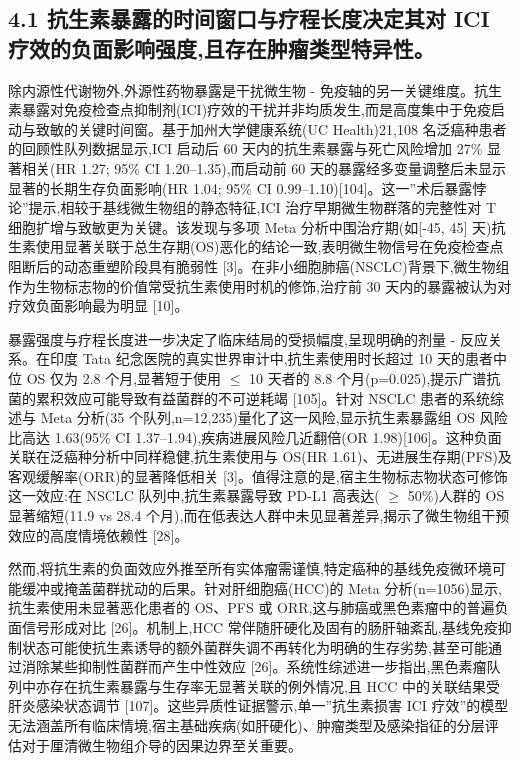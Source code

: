\documentclass[11pt]{article}
\begin{document}
\subsection{4.1 抗生素暴露的时间窗口与疗程长度决定其对 ICI 疗效的负面影响强度,且存在肿瘤类型特异性。}\label{ux6297ux751fux7d20ux66b4ux9732ux7684ux65f6ux95f4ux7a97ux53e3ux4e0eux7597ux7a0bux957fux5ea6ux51b3ux5b9aux5176ux5bf9-ici-ux7597ux6548ux7684ux8d1fux9762ux5f71ux54cdux5f3aux5ea6ux4e14ux5b58ux5728ux80bfux7624ux7c7bux578bux7279ux5f02ux6027}

除内源性代谢物外,外源性药物暴露是干扰微生物 - 免疫轴的另一关键维度。抗生素暴露对免疫检查点抑制剂(ICI)疗效的干扰并非均质发生,而是高度集中于免疫启动与致敏的关键时间窗。基于加州大学健康系统(UC Health)21,108 名泛癌种患者的回顾性队列数据显示,ICI 启动后 60 天内的抗生素暴露与死亡风险增加 27\% 显著相关(HR 1.27; 95\% CI 1.20--1.35),而启动前 60 天的暴露经多变量调整后未显示显著的长期生存负面影响(HR 1.04; 95\% CI 0.99--1.10){[}104{]}。这一''术后暴露悖论''提示,相较于基线微生物组的静态特征,ICI 治疗早期微生物群落的完整性对 T 细胞扩增与致敏更为关键。该发现与多项 Meta 分析中围治疗期(如{[}-45, 45{]} 天)抗生素使用显著关联于总生存期(OS)恶化的结论一致,表明微生物信号在免疫检查点阻断后的动态重塑阶段具有脆弱性 {[}3{]}。在非小细胞肺癌(NSCLC)背景下,微生物组作为生物标志物的价值常受抗生素使用时机的修饰,治疗前 30 天内的暴露被认为对疗效负面影响最为明显 {[}10{]}。

暴露强度与疗程长度进一步决定了临床结局的受损幅度,呈现明确的剂量 - 反应关系。在印度 Tata 纪念医院的真实世界审计中,抗生素使用时长超过 10 天的患者中位 OS 仅为 2.8 个月,显著短于使用 \(\leq\) 10 天者的 8.8 个月(p=0.025),提示广谱抗菌的累积效应可能导致有益菌群的不可逆耗竭 {[}105{]}。针对 NSCLC 患者的系统综述与 Meta 分析(35 个队列,n=12,235)量化了这一风险,显示抗生素暴露组 OS 风险比高达 1.63(95\% CI 1.37--1.94),疾病进展风险几近翻倍(OR 1.98){[}106{]}。这种负面关联在泛癌种分析中同样稳健,抗生素使用与 OS(HR 1.61)、无进展生存期(PFS)及客观缓解率(ORR)的显著降低相关 {[}3{]}。值得注意的是,宿主生物标志物状态可修饰这一效应:在 NSCLC 队列中,抗生素暴露导致 PD-L1 高表达( \(\geq\) 50\%)人群的 OS 显著缩短(11.9 vs 28.4 个月),而在低表达人群中未见显著差异,揭示了微生物组干预效应的高度情境依赖性 {[}28{]}。

然而,将抗生素的负面效应外推至所有实体瘤需谨慎,特定癌种的基线免疫微环境可能缓冲或掩盖菌群扰动的后果。针对肝细胞癌(HCC)的 Meta 分析(n=1056)显示,抗生素使用未显著恶化患者的 OS、PFS 或 ORR,这与肺癌或黑色素瘤中的普遍负面信号形成对比 {[}26{]}。机制上,HCC 常伴随肝硬化及固有的肠肝轴紊乱,基线免疫抑制状态可能使抗生素诱导的额外菌群失调不再转化为明确的生存劣势,甚至可能通过消除某些抑制性菌群而产生中性效应 {[}26{]}。系统性综述进一步指出,黑色素瘤队列中亦存在抗生素暴露与生存率无显著关联的例外情况,且 HCC 中的关联结果受肝炎感染状态调节 {[}107{]}。这些异质性证据警示,单一''抗生素损害 ICI 疗效''的模型无法涵盖所有临床情境,宿主基础疾病(如肝硬化)、肿瘤类型及感染指征的分层评估对于厘清微生物组介导的因果边界至关重要。
\end{document}

